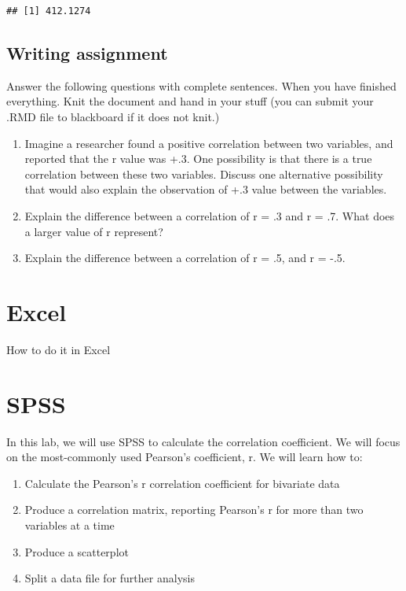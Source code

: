 \documentclass[
]{book}
\providecommand{\tightlist}{%
  \setlength{\itemsep}{0pt}\setlength{\parskip}{0pt}}
\begin{document}
\begin{verbatim}
## [1] 412.1274
\end{verbatim}

\hypertarget{writing-assignment-2}{%
\subsection{Writing assignment}\label{writing-assignment-2}}

Answer the following questions with complete sentences. When you have finished everything. Knit the document and hand in your stuff (you can submit your .RMD file to blackboard if it does not knit.)

\begin{enumerate}
\def\labelenumi{\arabic{enumi}.}
\item
  Imagine a researcher found a positive correlation between two variables, and reported that the r value was +.3. One possibility is that there is a true correlation between these two variables. Discuss one alternative possibility that would also explain the observation of +.3 value between the variables.
\item
  Explain the difference between a correlation of r = .3 and r = .7. What does a larger value of r represent?
\item
  Explain the difference between a correlation of r = .5, and r = -.5.
\end{enumerate}

\hypertarget{excel-3}{%
\section{Excel}\label{excel-3}}

How to do it in Excel

\hypertarget{spss-3}{%
\section{SPSS}\label{spss-3}}

In this lab, we will use SPSS to calculate the correlation coefficient. We will focus on the most-commonly used Pearson's coefficient, r. We will learn how to:

\begin{enumerate}
\def\labelenumi{\arabic{enumi}.}
\tightlist
\item
  Calculate the Pearson's r correlation coefficient for bivariate data
\item
  Produce a correlation matrix, reporting Pearson's r for more than two variables at a time
\item
  Produce a scatterplot
\item
  Split a data file for further analysis
\end{enumerate}
\end{document}
